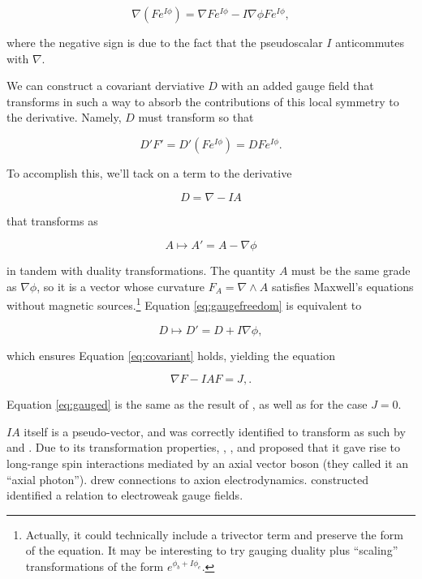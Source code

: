 \documentclass{article}
\begin{document}
  \begin{equation}
    \nabla (F e^{I \phi}) = \nabla F e^{I \phi} - I \nabla \phi F e^{I\phi},
  \end{equation}

  where the negative sign is due to the fact that the pseudoscalar $I$ anticommutes with $\nabla$.

  We can construct a covariant derviative $D$ with an added gauge field that transforms in such a way to absorb the contributions of this local symmetry to the derivative. Namely, $D$ must transform so that

  \begin{equation}
    D' F' = D' (F e^{I \phi}) = D F e^{I \phi}. \label{eq:covariant}
  \end{equation}

  To accomplish this, we'll tack on a term to the derivative

  \begin{equation}
    D = \nabla - I A
  \end{equation}

  that transforms as

  \begin{equation}
    A \mapsto A' = A - \nabla \phi\label{eq:gaugefreedom}
  \end{equation}

  in tandem with duality transformations. The quantity $A$ must be the same grade as $\nabla \phi$, so it is a vector whose curvature $F_A = \nabla \wedge A$ satisfies Maxwell's equations without magnetic sources.\footnote{Actually, it could technically include a trivector term and preserve the form of the equation. It may be interesting to try gauging duality plus ``scaling'' transformations of the form $e^{\phi_b + I \phi_e}$.} Equation \ref{eq:gaugefreedom} is equivalent to

  \begin{equation}
    D \mapsto D' = D + I \nabla \phi,
  \end{equation}

  which ensures Equation \ref{eq:covariant} holds, yielding the equation

  \begin{equation}
    \nabla F - I A F = J,\label{eq:gauged}.
  \end{equation}

  Equation \ref{eq:gauged} is the same as the result of \cite{tiwari}, as well as \cite{malik} for the case $J=0$.

  $IA$ itself is a pseudo-vector, and was correctly identified to transform as such by \cite{malik} and \cite{tiwari}. Due to its transformation properties, \cite{malik}, \cite{naik}, and \cite{pmn} proposed that it gave rise to long-range spin interactions mediated by an axial vector boson (they called it an ``axial photon''). \cite{tiwari}  drew connections to axion electrodynamics. \cite{vasconcellos} constructed identified a relation to electroweak gauge fields.
\end{document}
